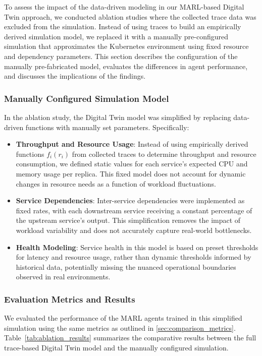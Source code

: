 \documentclass[conference]{IEEEtran}
\begin{document}
To assess the impact of the data-driven modeling in our MARL-based Digital Twin approach, we conducted ablation studies where the collected trace data was excluded from the simulation. Instead of using traces to build an empirically derived simulation model, we replaced it with a manually pre-configured simulation that approximates the Kubernetes environment using fixed resource and dependency parameters. This section describes the configuration of the manually pre-fabricated model, evaluates the differences in agent performance, and discusses the implications of the findings.

\subsubsection{Manually Configured Simulation Model}

In the ablation study, the Digital Twin model was simplified by replacing data-driven functions with manually set parameters. Specifically:
\begin{itemize}
    \item \textbf{Throughput and Resource Usage}: Instead of using empirically derived functions $f_i(r_i)$ from collected traces to determine throughput and resource consumption, we defined static values for each service’s expected CPU and memory usage per replica. This fixed model does not account for dynamic changes in resource needs as a function of workload fluctuations.
    \item \textbf{Service Dependencies}: Inter-service dependencies were implemented as fixed rates, with each downstream service receiving a constant percentage of the upstream service’s output. This simplification removes the impact of workload variability and does not accurately capture real-world bottlenecks.
    \item \textbf{Health Modeling}: Service health in this model is based on preset thresholds for latency and resource usage, rather than dynamic thresholds informed by historical data, potentially missing the nuanced operational boundaries observed in real environments.
\end{itemize}

\subsubsection{Evaluation Metrics and Results}

We evaluated the performance of the MARL agents trained in this simplified simulation using the same metrics as outlined in \autoref{sec:comparison_metrics}. Table~\ref{tab:ablation_results} summarizes the comparative results between the full trace-based Digital Twin model and the manually configured simulation.
\end{document}
